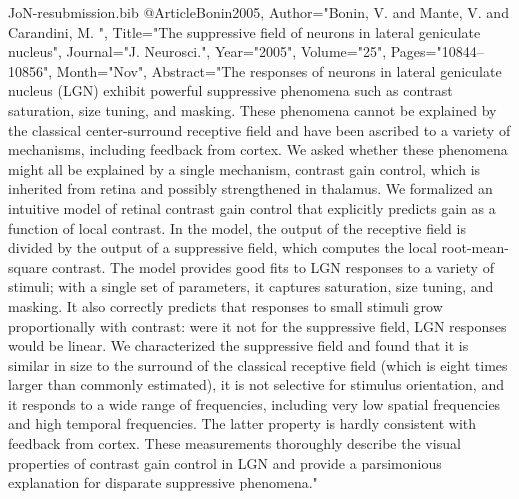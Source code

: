 \documentclass{article}
\begin{document}
\begin{filecontents}{JoN-resubmission.bib}
@Article{Bonin2005,
   Author="Bonin, V.  and Mante, V.  and Carandini, M. ",
   Title="{{T}he suppressive field of neurons in lateral geniculate nucleus}",
   Journal="J. Neurosci.",
   Year="2005",
   Volume="25",
   Pages="10844--10856",
   Month="Nov",
   Abstract="The responses of neurons in lateral geniculate nucleus
(LGN) exhibit powerful suppressive phenomena such as contrast
saturation, size tuning, and masking. These phenomena cannot be
explained by the classical center-surround receptive field and have
been ascribed to a variety of mechanisms, including feedback from
cortex. We asked whether these phenomena might all be explained by a
single mechanism, contrast gain control, which is inherited from
retina and possibly strengthened in thalamus. We formalized an
intuitive model of retinal contrast gain control that explicitly
predicts gain as a function of local contrast. In the model, the
output of the receptive field is divided by the output of a
suppressive field, which computes the local root-mean-square
contrast. The model provides good fits to LGN responses to a variety
of stimuli; with a single set of parameters, it captures saturation,
size tuning, and masking. It also correctly predicts that responses to
small stimuli grow proportionally with contrast: were it not for the
suppressive field, LGN responses would be linear. We characterized the
suppressive field and found that it is similar in size to the surround
of the classical receptive field (which is eight times larger than
commonly estimated), it is not selective for stimulus orientation, and
it responds to a wide range of frequencies, including very low spatial
frequencies and high temporal frequencies. The latter property is
hardly consistent with feedback from cortex. These measurements
thoroughly describe the visual properties of contrast gain control in
LGN and provide a parsimonious explanation for disparate suppressive
phenomena."  }



\end{filecontents}
\end{document}
